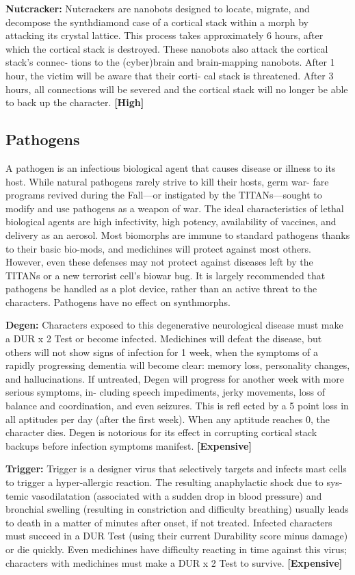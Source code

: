 \textbf{Nutcracker:} Nutcrackers are nanobots designed to 
locate, migrate, and decompose the synthdiamond 
case of a cortical stack within a morph by attacking 
its crystal lattice. This process takes approximately 
6 hours, after which the cortical stack is destroyed. 
These nanobots also attack the cortical stack's connec-
tions to the (cyber)brain and brain-mapping nanobots. 
After 1 hour, the victim will be aware that their corti-
cal stack is threatened. After 3 hours, all connections 
will be severed and the cortical stack will no longer be 
able to back up the character. \textbf{[High]}

\subsection{Pathogens}

A pathogen is an infectious biological agent that 
causes disease or illness to its host. While natural 
pathogens rarely strive to kill their hosts, germ war-
fare programs revived during the Fall—or instigated 
by the TITANs—sought to modify and use pathogens 
as a weapon of war. The ideal characteristics of lethal 
biological agents are high infectivity, high potency, 
availability of vaccines, and delivery as an aerosol. 
Most biomorphs are immune to standard pathogens 
thanks to their basic bio-mods, and medichines will 
protect against most others. However, even these 
defenses may not protect against diseases left by 
the TITANs or a new terrorist cell's biowar bug. It 
is largely recommended that pathogens be handled 
as a plot device, rather than an active threat to the 
characters. Pathogens have no effect on synthmorphs.

\textbf{Degen:} Characters exposed to this degenerative 
neurological disease must make a DUR x 2 Test or 
become infected. Medichines will defeat the disease, 
but others will not show signs of infection for 1 week, 
when the symptoms of a rapidly progressing dementia 
will become clear: memory loss, personality changes, 
and hallucinations. If untreated, Degen will progress 
for another week with more serious symptoms, in-
cluding speech impediments, jerky movements, loss 
of balance and coordination, and even seizures. This 
is refl ected by a 5 point loss in all aptitudes per day 
(after the first week). When any aptitude reaches 0, 
the character dies. Degen is notorious for its effect 
in corrupting cortical stack backups before infection 
symptoms manifest. \textbf{[Expensive]}

\textbf{Trigger:} Trigger is a designer virus that selectively 
targets and infects mast cells to trigger a hyper-allergic 
reaction. The resulting anaphylactic shock due to sys-
temic vasodilatation (associated with a sudden drop 
in blood pressure) and bronchial swelling (resulting in 
constriction and difficulty breathing) usually leads to 
death in a matter of minutes after onset, if not treated. 
Infected characters must succeed in a DUR Test (using 
their current Durability score minus damage) or die 
quickly. Even medichines have difficulty reacting in 
time against this virus; characters with medichines 
must make a DUR x 2 Test to survive. \textbf{[Expensive]}

